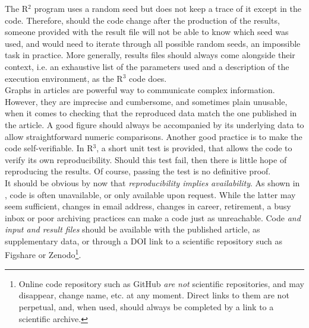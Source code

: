 \documentclass[a4paper,11pt]{article}
\begin{document}
The R$^2$ program uses a random seed but does not keep a trace of it except in the code. Therefore, should the code change after the production of the results, someone provided with the result file will not be able to know which seed was used, and would need to iterate through all possible random seeds, an impossible task in practice. More generally, results files should always come alongside their context, i.e. an exhaustive list of the parameters used and a description of the execution environment, as the R$^3$ code does.\\


Graphs in articles are powerful way to communicate complex information. However, they are imprecise and cumbersome, and sometimes plain unusable, when it comes to checking that the reproduced data match the one published in the article. A good figure should always be accompanied by its underlying data to allow straightforward numeric comparisons.
%
Another good practice is to make the code self-verifiable. In R$^3$, a short unit test is provided, that allows the code to verify its own reproducibility. Should this test fail, then there is little hope of reproducing the results. Of course, passing the test is no definitive proof.\\

It should be obvious by now that \emph{reproducibility implies availability}. As shown in \citep{Collberg:2016}, code is often unavailable, or only available upon request. While the latter may seem sufficient, changes in email address, changes in career, retirement, a busy inbox or poor archiving practices can make a code just as unreachable. Code \emph{and input and result files} should be available with the published article, as supplementary data, or through a DOI link to a scientific repository such as Figshare or Zenodo\footnote{Online code repository such as GitHub \emph{are not} scientific repositories, and may disappear, change name, etc. at any moment. Direct links to them are not perpetual, and, when used, should always be completed by a link to a scientific archive.}.\\
\end{document}
